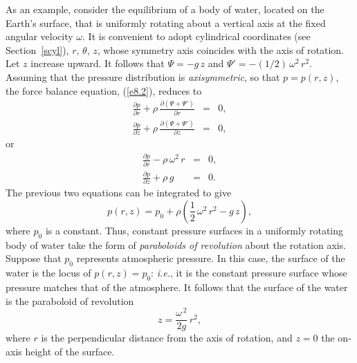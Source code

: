As an example, consider the equilibrium of a body of water, located on the Earth's surface, that is uniformly rotating about a vertical
axis at the fixed angular velocity $\omega$. It is convenient to adopt cylindrical
coordinates (see Section~\ref{scyl}), $r$, $\theta$, $z$, whose symmetry axis coincides with the axis of rotation. Let $z$ increase upward.  It follows
that $\Psi=-g\,z$ and $\Psi' =-(1/2)\,\omega^2\,r^2$. Assuming that the pressure distribution is {\em axisymmetric},
so that $p=p(r,z)$, the force balance equation, (\ref{e8.2}), reduces to
\begin{eqnarray}
\frac{\partial p}{\partial r} + \rho\,\frac{\partial (\Psi+\Psi')}{\partial r} &=&0,\\[0.5ex]
\frac{\partial p}{\partial z} + \rho\,\frac{\partial (\Psi+\Psi')}{\partial z} &=&0,
\end{eqnarray}
or
\begin{eqnarray}
\frac{\partial p}{\partial r} - \rho\,\omega^2\,r&=&0,\\[0.5ex]
\frac{\partial p}{\partial z} +\rho\,g &=&0.
\end{eqnarray}
The previous two equations can be integrated to give
\begin{equation}
p(r,z) = p_0 + \rho\left(\frac{1}{2}\,\omega^2\,r^2- g\,z\right),
\end{equation}
where $p_0$ is a constant. Thus, constant pressure surfaces in a uniformly rotating
body of water take the form of {\em paraboloids of revolution}\/ about the rotation axis. Suppose that $p_0$ represents
atmospheric pressure. In this case, the surface of the water is the locus of $p(r,z)=p_0$: {\em i.e.},
it is the constant pressure surface whose pressure matches that of the atmosphere. It follows that the
surface of the water is the paraboloid of revolution 
\begin{equation}
z = \frac{\omega^{\,2}}{2g}\,r^2,
\end{equation}
where  $r$ is the perpendicular distance from the axis
of rotation, and $z=0$  the on-axis height of the surface.

